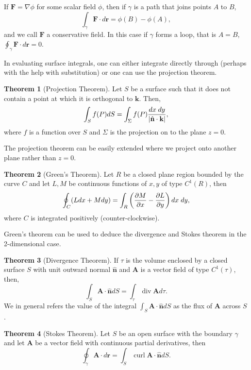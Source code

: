 \documentclass[
]{article}
\theoremstyle{definition}
\newtheorem{theorem}{Theorem}
\theoremstyle{definition}
\begin{document}
If \(\mathbf{F} = \nabla \phi\) for some scalar field \(\phi\), then if
\(\gamma\) is a path that joins points \(A\) to \(B\),
\[\int_\gamma \mathbf{F} \cdot d\mathbf{r} = \phi(B) - \phi(A),\] and we
call \(\mathbf{F}\) a conservative field. In this case if \(\gamma\)
forms a loop, that is \(A = B\),
\(\oint_\gamma \mathbf{F} \cdot d\mathbf{r} = 0\).

In evaluating surface integrals, one can either integrate directly
through (perhaps with the help with substitution) or one can use the
projection theorem.

\begin{theorem}[Projection Theorem]
  Let \(S\) be a surface such that it does not contain a point at which it is 
  orthogonal to \(\mathbf{k}\). Then, 
  \[\int_S f(P) dS = \int_\Sigma f(P) \frac{dx \hspace{1mm} dy} 
    {\left| \hat{\mathbf{n}}\cdot\mathbf{k} \right|},\]
  where \(f\) is a function over \(S\) and \(\Sigma\) is the projection on to the 
  plane \(z = 0\).
\end{theorem}

The projection theorem can be easily extended where we project onto
another plane rather than \(z = 0\).

\begin{theorem}[Green's Theorem]
  Let \(R\) be a closed plane region bounded by the curve \(C\) and let \(L, M\) 
  be continuous functions of \(x, y\) of type \(C^1(R)\), then 
  \[\oint_C (L dx + M dy) = \int_R \left(\frac{\partial M}{\partial x} - 
    \frac{\partial L}{\partial y}\right)dx \hspace{1mm} dy,\]
  where \(C\) is integrated positively (counter-clockwise).
\end{theorem}

Green's theorem can be used to deduce the divergence and Stokes theorem
in the 2-dimensional case.

\begin{theorem}[Divergence Theorem]
  If \(\tau\) is the volume enclosed by a closed surface \(S\) with unit outward normal 
  \(\hat{\mathbf{n}}\) and \(\mathbf{A}\) is a vector field of type \(C^1(\tau)\), 
  then, 
  \[\int_S \mathbf{A} \cdot \hat{\mathbf{n}} dS = \int_\tau \mathop{\mathrm{div}}\mathbf{A} d\tau.\]
  We in general refers the value of the integral \(\int_S \mathbf{A} \cdot \hat{\mathbf{n}} dS\) 
  as the flux of \(\mathbf{A}\) across \(S\).
\end{theorem}

\begin{theorem}[Stokes Theorem]
  Let \(S\) be an open surface with the boundary \(\gamma\) and let \(\mathbf{A}\) 
  be a vector field with continuous partial derivatives, then 
  \[\oint_\gamma \mathbf{A} \cdot d\mathbf{r} = \int_S \mathop{\mathrm{curl}}\mathbf{A} \cdot \hat{\mathbf{n}} dS.\]
\end{theorem}
\end{document}
